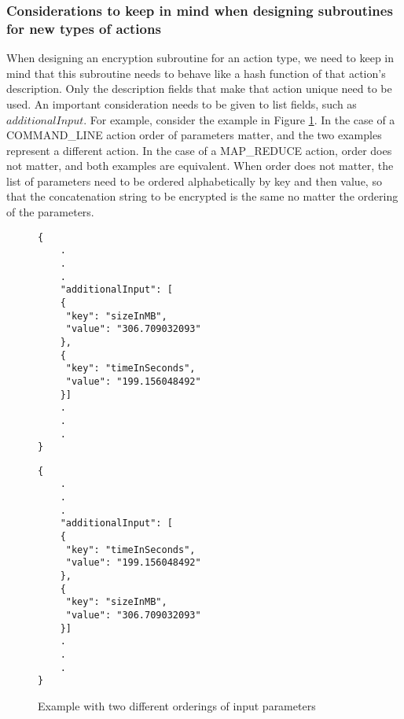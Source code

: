 \subsubsection{Considerations to keep in mind when designing subroutines for new types of actions}
When designing an encryption subroutine for an action type, we need to keep in mind that this subroutine needs to behave like a hash function of that action's description.  Only the description fields that make that action unique need to be used. An important consideration needs to be given to list fields, such as $additionalInput$.  For example, consider the example in Figure \ref{fig:action_parameters_ordering}.  In the case of a COMMAND\_LINE action order of parameters matter, and the two examples represent a different action.  In the case of a MAP\_REDUCE action, order does not matter, and both examples are equivalent.  When order does not matter, the list of parameters need to be ordered alphabetically by key and then value, so that the concatenation string to be encrypted is the same no matter the ordering of the parameters.

\begin{figure}[htbp]
\centering
\begin{singlespace}
\begin{minipage}[b]{7 cm}
\begin{mdframed}
\begin{verbatim}
{
    .
    .
    .
    "additionalInput": [
    {
     "key": "sizeInMB",
     "value": "306.709032093"
    }, 
    {
     "key": "timeInSeconds", 
     "value": "199.156048492"
    }]
    .
    .
    .
}
\end{verbatim}
\end{mdframed}
\end{minipage}
\begin{minipage}[b]{7 cm}
\begin{mdframed}
\begin{verbatim}
{
    .
    .
    .
    "additionalInput": [
    {
     "key": "timeInSeconds", 
     "value": "199.156048492"
    },
    {
     "key": "sizeInMB",
     "value": "306.709032093"
    }]
    .
    .
    .
}
\end{verbatim}
\end{mdframed}
\end{minipage}
\end{singlespace}
\caption{Example with two different orderings of input parameters}
\label{fig:action_parameters_ordering}
\end{figure}



